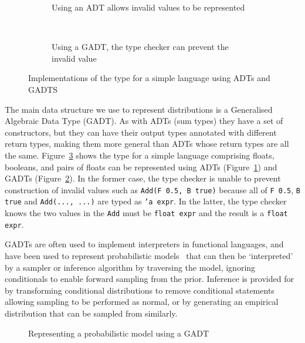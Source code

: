 \documentclass[sigconf,timestamp]{acmart}
\begin{document}
\begin{figure}
  \centering
  \begin{subfigure}[t]{\columnwidth}
    \caption{\label{lst:adt}Using an ADT allows invalid values to be represented}
  \end{subfigure}
  \quad\\
  \begin{subfigure}[t]{\columnwidth}
    \caption{\label{lst:gadteg}Using a GADT, the type checker can prevent the invalid value}
  \end{subfigure}
  \caption{\label{lst:adtgadt}Implementations of the type for a simple language using ADTs and GADTS}
\end{figure}

The main data structure we use to represent distributions is a Generalised Algebraic Data Type (GADT). As with ADTs (sum types) they have a set of constructors, but they can have their output types annotated with different return types, making them more general than ADTs whose return types are all the same. Figure~\ref{lst:adtgadt} shows the type for  a simple language comprising floats, booleans, and pairs of floats can be represented using ADTs (Figure~\ref{lst:adt}) and GADTs (Figure~\ref{lst:gadteg}). In the former case, the type checker is unable to prevent construction of invalid values such as \texttt{Add(F 0.5, B true)} because all of \texttt{F 0.5}, \texttt{B true} and \texttt{Add(..., ...)} are typed as \texttt{'a expr}. In the latter, the type checker knows the two values in the \texttt{Add} must be \texttt{float expr} and the result is a \texttt{float expr}.

GADTs are often used to implement interpreters in functional languages, and have been used to represent probabilistic models~\cite{scibior2015practical} that can then be `interpreted' by a sampler or inference algorithm by traversing the model, ignoring conditionals to enable forward sampling from the prior. Inference is provided for by transforming conditional distributions to remove conditional statements allowing sampling to be performed as normal, or by generating an empirical distribution that can be sampled from similarly.

\begin{figure}
  \small
  \caption{\label{lst:gadt}Representing a probabilistic model using a GADT}
\end{figure}
\end{document}
